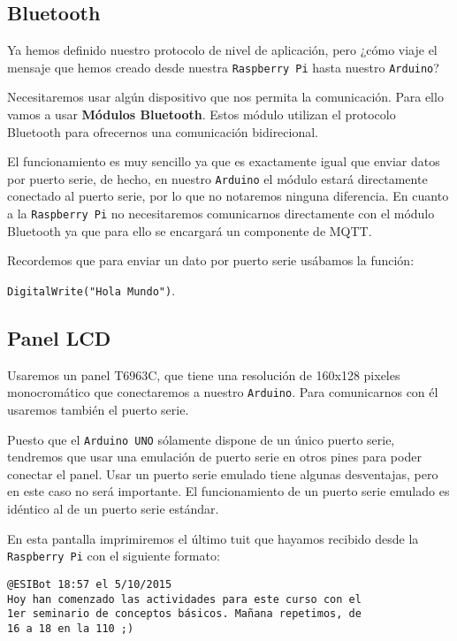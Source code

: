 \subsection{Bluetooth} %
\label{sub:bluetooth}

Ya hemos definido nuestro protocolo de nivel de aplicación, pero ¿cómo viaje el
mensaje que hemos creado desde nuestra \texttt{Raspberry Pi} hasta nuestro
\texttt{Arduino}?

Necesitaremos usar algún dispositivo que nos permita la comunicación. Para ello
vamos a usar \textbf{Módulos Bluetooth}. Estos módulo utilizan el protocolo
Bluetooth para ofrecernos una comunicación bidirecional.

El funcionamiento es muy sencillo ya que es exactamente igual que enviar datos
por puerto serie, de hecho, en nuestro \texttt{Arduino} el módulo estará
directamente conectado al puerto serie, por lo que no notaremos ninguna
diferencia. En cuanto a la \texttt{Raspberry Pi} no necesitaremos comunicarnos
directamente con el módulo Bluetooth ya que para ello se encargará un componente
de MQTT.

Recordemos que para enviar un dato por puerto serie usábamos la función:

\texttt{DigitalWrite("Hola Mundo")}.

\subsection{Panel LCD} %
\label{sub:panel_lcd}

Usaremos un panel T6963C, que tiene una resolución de  160x128 pixeles monocromático
que conectaremos a nuestro \texttt{Arduino}. Para comunicarnos con él usaremos
también el puerto serie.

Puesto que  el \texttt{Arduino UNO} sólamente dispone
de un único puerto serie, tendremos que usar una emulación de puerto serie
en otros pines para poder conectar el panel. Usar un puerto serie emulado
tiene algunas desventajas, pero en este caso no será importante. El funcionamiento
de un puerto serie emulado es idéntico al de un puerto serie estándar.

En esta pantalla imprimiremos el último tuit que hayamos recibido desde la
\texttt{Raspberry Pi} con el siguiente formato:

\begin{verbatim}
@ESIBot 18:57 el 5/10/2015
Hoy han comenzado las actividades para este curso con el
1er seminario de conceptos básicos. Mañana repetimos, de
16 a 18 en la 110 ;)
\end{verbatim}